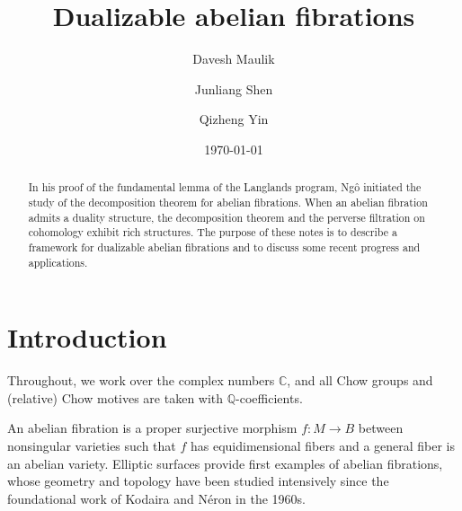 \documentclass[11pt]{amsart}
\theoremstyle{plain}
\theoremstyle{definition}
\theoremstyle{remark}
\newcommand{\BC}{{\mathbb{C}}}
\newcommand{\BQ}{{\mathbb{Q}}}
\begin{document}
\title[Dualizable abelian fibrations]{Dualizable abelian fibrations}
\date{\today}


\author[D. Maulik]{Davesh Maulik}
\address{Massachusetts Institute of Technology}

\author[J. Shen]{Junliang Shen}
\address{Yale University}

\author[Q. Yin]{Qizheng Yin}
\address{Peking University}





\begin{abstract}

In his proof of the fundamental lemma of the Langlands program, Ngô initiated the study of the decomposition theorem for abelian fibrations. When an abelian fibration admits a duality structure, the decomposition theorem and the perverse filtration on cohomology exhibit rich structures. The purpose of these notes is to describe a framework for dualizable abelian fibrations and to discuss some recent progress and applications.
 
\end{abstract}

\maketitle

\setcounter{tocdepth}{1} 

\tableofcontents
\setcounter{section}{-1}

\section{Introduction}

Throughout, we work over the complex numbers $\BC$, and all Chow groups and (relative) Chow motives are taken with $\BQ$-coefficients.


An abelian fibration is a proper surjective morphism $f: M \to B$ between nonsingular varieties such that $f$ has equidimensional fibers and a general fiber is an abelian variety. Elliptic surfaces provide first examples of abelian fibrations, whose geometry and topology have been studied intensively since the foundational work of Kodaira and N\'eron in the 1960s. 
\end{document}

